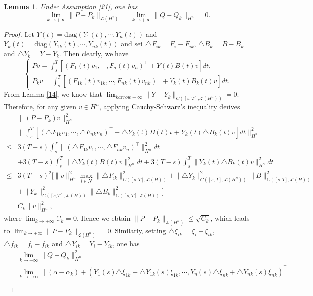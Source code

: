 \documentclass[10pt]{article}
\newtheorem{lemma}{Lemma}[section]
\begin{document}
\begin{lemma}\label{33}
Under Assumption \ref{21}, one has $$\lim_{k\rightarrow+\infty}\|P-P_k\|_{\mathcal{L}(H^n)}=\lim_{k\rightarrow+\infty}\|Q-Q_k\|_{H^n}=0.$$
\end{lemma}
\begin{proof}
Let $Y(t)=\mbox{diag}(Y_1(t),\cdots,Y_n(t))$ and 
$Y_k(t)=\mbox{diag}(Y_{1k}(t),\cdots,Y_{nk}(t))$ and  set $\triangle F_{ik}=F_i-F_{ik}$,  $\triangle B_{k}=B-B_{k}$ and $\triangle Y_{k}=Y-Y_{k}$. Then clearly, we have
$$
\begin{cases}
Pv=\int_s^T[ (F_1(t)v_1,\cdots,F_n(t)v_n)^{\top}+Y(t)B(t)v]dt, \\
P_kv=\int_s^T[ (F_{1k}(t)v_{1k},\cdots,F_{nk}(t)v_{nk})^{\top}+Y_{k}(t)B_{k}(t)v]dt.
\end{cases}
$$
From Lemma \ref{14}, we know that $\lim_{karrow+\infty}\|Y-Y_k\|_{C([s,T],\mathcal{L}(H^n))}=0$. Therefore,   for any given $v\in H^n$, applying Cauchy-Schwarz's inequality  derives
\begin{align*}
&\|(P-P_k)v\|^2_{H^n}\\
=& \|\int_s^T[ (\triangle F_{1k}v_1,\cdots,\triangle F_{nk}v_n)^{\top}+\triangle Y_{k}(t)B(t)v+Y_{k}(t)\triangle B_{k}(t)v]dt\|^2_{H^n}\\
\leq& 3(T-s)\int_s^T\|(\triangle F_{1k}v_1,\cdots,\triangle F_{nk}v_n)^{\top}\|^2_{H^n}dt\\
&+3(T-s)\int_s^T\|\triangle Y_{k}(t)B(t)v\|^2_{H^n}dt+3(T-s)\int_s^T\|Y_{k}(t)\triangle B_{k}(t)v\|^2_{H^n}dt\\
\leq& 3(T-s)^2[\|v\|^2_{H^n}\max_{i\in N}\|\triangle F_{ik}\|^2_{ C([s,T],\mathcal{L}(H))}+\|\triangle Y_{k}\|^2_{ C([s,T],\mathcal{L}(H^n))}\|B\|^2_{C([s,T],\mathcal{L}(H))}\\
&
+\|Y_k\|^2_{C([s,T],\mathcal{L}(H))}\|\triangle B_{k}\|^2_{C([s,T],\mathcal{L}(H))}]\\
= &C_k\|v\|_{H^n}^2,
\end{align*}
where $\lim_{k\rightarrow+\infty}C_k=0$. Hence we obtain $\|P-P_k\|_{\mathcal{L}(H^n)}\leq \sqrt{C_k}$, which leads to $\lim_{k\rightarrow+\infty}\|P-P_k\|_{\mathcal{L}(H^n)}=0$.
Similarly, setting $\triangle \xi_{ik}=\xi_i-\xi_{ik}$,  $\triangle f_{ik}=f_i-f_{ik}$ and $\triangle Y_{ik}=Y_i-Y_{ik}$, one has
\begin{align*}
&\lim_{k\rightarrow+\infty}\|Q-Q_k\|^2_{H^n}\\
=&\lim_{k\rightarrow+\infty}\|(\alpha-\overline{\alpha}_{k})+(Y_1(s)\triangle\xi_{1k}+\triangle Y_{1k}(s)\xi_{1k},\cdots,Y_n(s)\triangle\xi_{nk}+\triangle Y_{nk}(s)\xi_{nk})^{\top}\\

\end{align*}
\end{proof}
\end{document}
